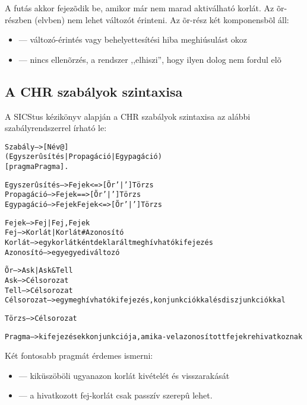 A futás akkor fejezõdik be, amikor már nem marad aktiválható korlát. Az õr-részben
(elvben) nem lehet változót érinteni. Az õr-rész két komponensbõl áll: 

\begin{itemize}
\item {} --- változó-érintés vagy behelyettesítési hiba meghiúsulást okoz
\item {} --- nincs ellenõrzés, a rendszer ,,elhiszi'', hogy ilyen dolog nem
fordul elõ
\end{itemize}

\subsection{A CHR szabályok szintaxisa}

A SICStus kézikönyv alapján a CHR szabályok szintaxisa az alábbi szabályrendszerrel
írható le:

\begin{alltt}
Szabály       --> [Név @] 
                    (Egyszerûsítés | Propagáció | Egypagáció)
                       [pragma Pragma].

Egyszerûsítés --> Fejek         <=> [Õr '|'] Törzs
Propagáció    --> Fejek         ==> [Õr '|'] Törzs
Egypagáció    --> Fejek \bs Fejek <=> [Õr '|'] Törzs

Fejek         --> Fej | Fej, Fejek
Fej           --> Korlát | Korlát \# Azonosító
Korlát        --> {\rm egy korlátként deklarált meghívható kifejezés}
Azonosító     --> {\rm egy egyedi változó}

Õr            --> Ask | Ask & Tell
Ask           --> Célsorozat
Tell          --> Célsorozat
Célsorozat    --> {\rm egy meghívható kifejezés, konjunkciókkal és diszjunkciókkal}

Törzs         --> Célsorozat

Pragma        --> {\rm kifejezések konjunkciója, amik a -vel azonosított fejekre hivatkoznak}
\end{alltt}

Két fontosabb pragmát érdemes ismerni:

\begin{itemize}
\item {} --- kiküszöböli ugyanazon korlát kivételét és
                   visszarakását
\item {} --- a hivatkozott fej-korlát csak passzív szerepû lehet. 
\end{itemize}

